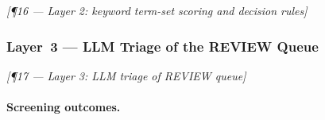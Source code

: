 
\bigskip\noindent\textit{[¶16 — Layer 2: keyword term-set scoring and decision rules]}

\subsubsection{Layer~3 — LLM Triage of the REVIEW Queue}


\bigskip\noindent\textit{[¶17 — Layer 3: LLM triage of REVIEW queue]}

\paragraph{Screening outcomes.}

